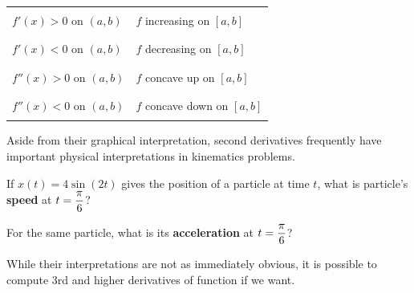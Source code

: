 {\huge
\vsc
\begin{center}
\begin{tabular}{|l|l|} \hline
\qquad \qquad \qquad \qquad \qquad  \qquad \qquad & \qquad  \qquad \qquad \qquad \qquad  \qquad \qquad \\
\qquad $f'(x) > 0 {\mbox{ on }} (a,b)$  &  \qquad $f$ increasing on $[a,b]$  \\
\qquad \qquad \qquad \qquad \qquad & \qquad \qquad \qquad  \qquad \qquad \\
 \hline
\qquad \qquad \qquad \qquad \qquad & \qquad \qquad \qquad  \qquad \qquad \\
\qquad $f'(x) < 0 {\mbox{ on }} (a,b)$  &  \qquad $f$ decreasing on $[a,b]$  \\
\qquad \qquad \qquad \qquad \qquad & \qquad \qquad \qquad  \qquad \qquad \\
 \hline
\qquad \qquad \qquad \qquad \qquad & \qquad \qquad \qquad  \qquad \qquad \\
\qquad $f''(x) > 0 {\mbox{ on }} (a,b)$  &  \qquad $f$ concave up on $[a,b]$  \\ \qquad \qquad \qquad \qquad \qquad & \qquad \qquad \qquad  \qquad \qquad \\
\hline
\qquad \qquad \qquad \qquad \qquad & \qquad \qquad \qquad  \qquad \qquad \\
\qquad $f''(x) < 0 {\mbox{ on }} (a,b)$  &  \qquad $f$ concave down on $[a,b]$ \qquad  \qquad  \\ 
\qquad \qquad \qquad \qquad \qquad & \qquad \qquad \qquad  \qquad \qquad \\
\hline
\end{tabular}
\end{center}
}
\setfont

\newpage

Aside from their graphical interpretation, second derivatives
frequently have important physical interpretations in kinematics
problems.

\problem If $x(t) = 4 \sin(2t)$ gives the position of a particle at
time $t$, what is particle's {\bf speed} at $\displaystyle t=\frac{\pi}{6}$?

\vfill

For the same particle, what is its {\bf acceleration} at
$\displaystyle t=\frac{\pi}{6}$?

\vfill

\newpage



While their interpretations are not as immediately obvious, it is
possible to compute 3rd and higher derivatives of function if we want.

